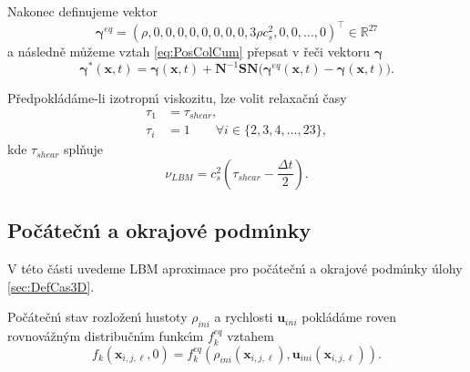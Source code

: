         Nakonec definujeme vektor 
        \begin{equation}
            \label{eq:GamEquCum}
                \boldsymbol{\gamma}^{eq} = \left( \rho, 0, 0, 0, 0, 0, 0, 0, 0, 3\rho c_s^2, 0, 0,\dots,0 \right)^\intercal \in \mathbb{R}^{27}
        \end{equation}
        a n\'{a}sledn\v{e} m\r{u}\v{z}eme vztah \eqref{eq:PosColCum} p\v{r}epsat v \v{r}e\v{c}i vektoru $\boldsymbol{\gamma}$
        \begin{equation}
            \label{eq:PosColCumGam}
                \boldsymbol{\gamma}^* (\boldsymbol{x},t) = \boldsymbol{\gamma} (\boldsymbol{x},t) + \boldsymbol{N}^{-1}\boldsymbol{S}\boldsymbol{N} \Big( \boldsymbol{\gamma}^{eq} (\boldsymbol{x},t) - \boldsymbol{\gamma} (\boldsymbol{x},t)\Big).
        \end{equation}

        P\v{r}edpokl\'{a}d\'{a}me-li izotropn\'{\i} viskozitu, lze volit relaxa\v{c}n\'{\i} \v{c}asy 
        \begin{subequations}
            \begin{align}
                \tau_1 &= \tau_{shear}, \\
                \tau_i &= 1  \qquad \forall i \in \{ 2,3,4,\dots,23 \}, 
            \end{align}
        \end{subequations}
        kde $\tau_{shear}$ spl\v{n}uje
        \begin{equation}
            \nu_{LBM} = c_s^2 \left( \tau_{shear} - \frac{\Delta t}{2} \right).
        \end{equation}

        \subsection{Po\v{c}\'{a}te\v{c}n\'{\i} a okrajov\'{e} podm\'{\i}nky}
        \label{sec:NSEIniCon}

            V t\'{e}to \v{c}\'{a}sti uvedeme LBM aproximace pro po\v{c}\'{a}te\v{c}n\'{\i} a okrajov\'{e} podm\'{\i}nky \'{u}lohy \ref{sec:DefCas3D}.

            Po\v{c}\'{a}te\v{c}n\'{\i} stav rozlo\v{z}en\'{\i} hustoty $\rho_{ini}$ a rychlosti $\boldsymbol{u}_{ini}$ pokl\'{a}d\'{a}me roven rovnov\'{a}\v{z}n\'{y}m distribu\v{c}n\'{\i}m funkc\'{\i}m $f_k^{eq}$ vztahem
            \begin{equation}
            \label{eq:FirIniCon}
                f_k(\boldsymbol{x}_{i,j,\ell}, 0) = f_{k}^{eq}(\rho_{ini}(\boldsymbol{x}_{i,j,\ell}), \boldsymbol{u}_{ini}(\boldsymbol{x}_{i,j,\ell})).
            \end{equation}
            
